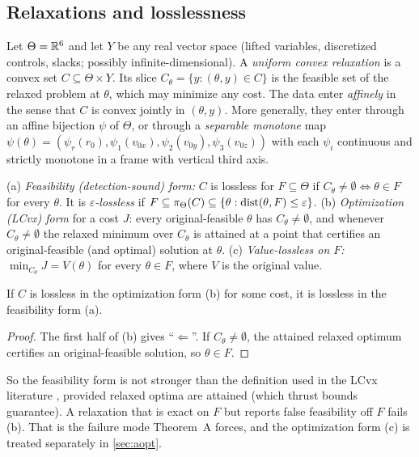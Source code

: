 \subsection{Relaxations and losslessness}\label{sec:defs}
\begin{definition}\label{def:ucr}
Let $\Theta=\mathbb{R}^6$ and let $Y$ be any real vector space (lifted variables, discretized controls, slacks; possibly
infinite-dimensional). A \emph{uniform convex relaxation} is a convex set $C\subseteq\Theta\times Y$. Its slice
$C_\theta=\{y:(\theta,y)\in C\}$ is the feasible set of the relaxed problem at $\theta$, which may minimize any cost.
The data enter \emph{affinely} in the sense that $C$ is convex jointly in $(\theta,y)$. More generally, they enter through
an affine bijection $\psi$ of $\Theta$, or through a \emph{separable monotone} map
$\psi(\theta)=(\psi_r(r_0),\psi_1(v_{0x}),\psi_2(v_{0y}),\psi_3(v_{0z}))$ with each $\psi_i$ continuous and strictly
monotone in a frame with vertical third axis.
\end{definition}

\begin{definition}[Losslessness]\label{def:lossless}
(a) \emph{Feasibility (detection-sound) form:} $C$ is lossless for $F\subseteq\Theta$ if
$C_\theta\neq\emptyset\iff\theta\in F$ for every $\theta$. It is \emph{$\varepsilon$-lossless} if
$F\subseteq\pi_\Theta(C)\subseteq\{\theta:\operatorname{dist}(\theta,F)\le\varepsilon\}$.
(b) \emph{Optimization (LCvx) form} for a cost $J$: every original-feasible $\theta$ has $C_\theta\ne\emptyset$, and
whenever $C_\theta\ne\emptyset$ the relaxed minimum over $C_\theta$ is attained at a point that certifies an
original-feasible (and optimal) solution at $\theta$.
(c) \emph{Value-lossless on $F$:} $\min_{C_\theta}J=V(\theta)$ for every $\theta\in F$, where $V$ is the original value.
\end{definition}

\begin{proposition}\label{prop:opt-feas}
If $C$ is lossless in the optimization form (b) for some cost, it is lossless in the feasibility form (a).\Slean
\end{proposition}
\begin{proof}
The first half of (b) gives ``$\Leftarrow$''. If $C_\theta\ne\emptyset$, the attained relaxed optimum certifies an
original-feasible solution, so $\theta\in F$.
\end{proof}
So the feasibility form is not stronger than the definition used in the LCvx literature
\cite{acikmese2013tcst,malyuta2022csm}, provided relaxed optima are attained (which thrust bounds guarantee). A
relaxation that is exact on $F$ but reports false feasibility off $F$ fails (b). That is the failure mode Theorem~A
forces, and the optimization form (c) is treated separately in \cref{sec:aopt}.

